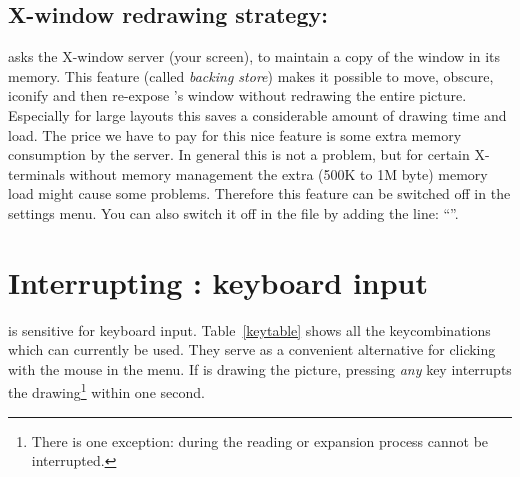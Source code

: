 \subsection{X-window redrawing strategy: \protect{}}
 asks the X-window server (your screen), to maintain a copy of the
window in its memory. This feature (called {\em backing store}) makes it
possible to move, obscure, iconify and then re-expose 's window
without redrawing the entire picture. Especially for large layouts this saves a
considerable amount of drawing time and  load. The price we have to
pay for this nice feature is some extra memory consumption by the server. In
general this is not a problem, but for certain X-terminals without memory
management the extra (500K to 1M byte) memory load might cause some problems.
Therefore this feature can be switched off in the settings menu. You can also
switch it off in the file  by adding the line:
``''.

\section{Interrupting \protect{}: keyboard input}
 is sensitive for keyboard input. Table~\ref{keytable} shows all
the keycombinations which can currently be used. They serve as a convenient
alternative for clicking with the mouse in the menu. If  is
drawing the picture, pressing {\em any} key interrupts the
drawing\footnote{There is one exception: during the reading or expansion
process  cannot be interrupted.} within one second. 

